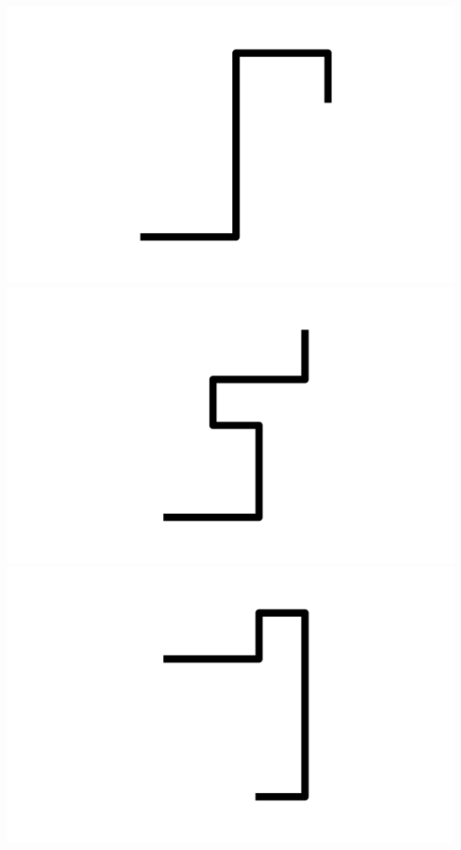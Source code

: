 \documentclass[]{report}
\begin{document}
\includegraphics[scale=.1]{pictures/21/state_cluster_shapes_214.pdf} 
\includegraphics[scale=.1]{pictures/21/state_cluster_shapes_215.pdf} 
\includegraphics[scale=.1]{pictures/21/state_cluster_shapes_216.pdf} 
\end{document}
